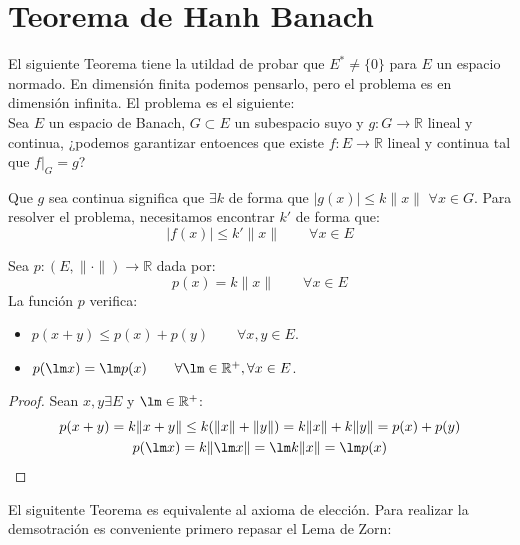 \newpage

\section{Teorema de Hanh Banach} %
\noindent
El siguiente Teorema tiene la utildad de probar que $E^\ast \neq \{0\}$ para $E$ un espacio normado. En dimensión finita podemos pensarlo, pero el problema es en dimensión infinita. El problema es el siguiente:\\

\noindent
Sea $E$ un espacio de Banach, $G\subset E$ un subespacio suyo y $g:G\to \mathbb{R}$ lineal y continua, ¿podemos garantizar entoences que existe $f:E\to \mathbb{R}$ lineal y continua tal que $f\big|_G = g$?

Que $g$ sea continua significa que $\exists k$ de forma que $|g(x)| \leq k\|x\|$ $\forall x\in G$. Para resolver el problema, necesitamos encontrar $k'$ de forma que:
\begin{equation*}
    |f(x)| \leq k'\|x\| \qquad \forall x\in E
\end{equation*}

\begin{ejercicio} %
    Sea $p:(E,\|\cdot \|)\to \mathbb{R}$ dada por:
    \begin{equation*}
        p(x) = k\|x\| \qquad \forall x\in E
    \end{equation*}
    La función $p$ verifica:
    \begin{itemize}
        \item $p(x+y) \leq p(x) + p(y) \qquad \forall x,y\in E$.
        \item $p(\lm x) = \lm p(x) \qquad \forall \lm \in \mathbb{R}^+, \forall x\in E$.
    \end{itemize}
    \begin{proof}
        Sean $x,y\exists E$ y $\lm\in \mathbb{R}^+$:
        \begin{gather*}
            p(x+y)= k\|x+y\| \leq k(\|x\| + \|y\|) = k\|x\| + k\|y\| = p(x) + p(y) \\
            p(\lm x) = k\|\lm x\| = \lm k \|x\| = \lm p(x)
        \end{gather*}
    \end{proof}
\end{ejercicio}

\noindent
El siguitente Teorema es equivalente al axioma de elección. Para realizar la demsotración es conveniente primero repasar el Lema de Zorn:

